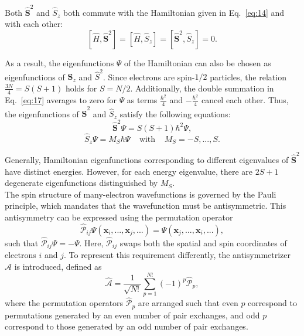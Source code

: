 \documentclass[%
 preprint, linenumbers,
 amsmath,amssymb,
 aps, physrev,
]{revtex4-2}
\begin{document}
Both $\hat{\mathbf{S}}^2$ and $\hat{S}_z$ both commute with the Hamiltonian given in Eq.~\eqref{eq:14} and with each other:
\begin{equation}
    \left[ \hat{H}, \hat{\mathbf{S}}^2 \right] = \left[ \hat{H}, \hat{S}_z \right] = \left[ \hat{\mathbf{S}}^2, \hat{S}_z \right] = 0.
\end{equation}

As a result, the eigenfunctions $\Psi$ of the Hamiltonian can also be chosen as eigenfunctions of $\mathbf{S}_z$ and $\hat{S}^2$. Since electrons are spin-$1/2$ particles, the relation $\frac{3N}{4} = S(S+1)$ holds for $S=N/2$. Additionally, the double summation in Eq.~\eqref{eq:17} averages to zero for $\Psi$ as terms $\frac{\hbar^2}{4}$ and $-\frac{\hbar^2}{4}$ cancel each other. Thus, the eigenfunctions of $\hat{\mathbf{S}}^2$ and $\hat{S}_z$ satisfy the following equations:
\begin{equation}
    \hat{\mathbf{S}}^2\Psi = S(S+1)\hbar^2\Psi,
\end{equation}
\begin{equation}
    \hat{S}_z\Psi = M_S\hbar\Psi \; \; \; \; \text{with} \; \; \; \; M_S = -S,...,S.
\end{equation}

Generally, Hamiltonian eigenfunctions corresponding to different eigenvalues of $\hat{\mathbf{S}}^2$ have distinct energies. However, for each energy eigenvalue, there are $2S+1$ degenerate eigenfunctions distinguished by $M_S$.\\

The spin structure of many-electron wavefunctions is governed by the Pauli principle, which mandates that the wavefunction must be antisymmetric. This antisymmetry can be expressed using the permutation operator
\begin{equation}
    \hat{\mathcal{P}}_{ij}\Psi(\mathbf{x}_i,...,\mathbf{x}_j,...) = \Psi(\mathbf{x}_j,...,\mathbf{x}_i,...),
\end{equation}
such that $\hat{\mathcal{P}}_{ij}\Psi = -\Psi$. Here, $\hat{\mathcal{P}}_{ij}$ swaps both the spatial and spin coordinates of electrons $i$ and $j$. To represent this requirement differently, the antisymmetrizer $\hat{\mathcal{A}}$ is introduced, defined as
\begin{equation}
    \hat{\mathcal{A}} = \frac{1}{\sqrt{N!}}\sum_{p=1}^{N!}(-1)^p\hat{\mathcal{P}}_p,
\end{equation}
where the permutation operators $\hat{\mathcal{P}}_p$ are arranged such that even $p$ correspond to permutations generated by an even number of pair exchanges, and odd $p$ correspond to those generated by an odd number of pair exchanges.\\
\end{document}
